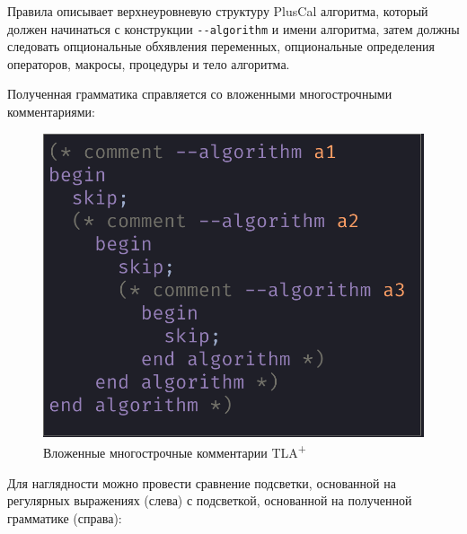 \documentclass[14pt, openany]{report}
\newcommand{\tlapl}{TLA\textsuperscript{+} }
\begin{document}
Правила описывает верхнеуровневую структуру PlusCal алгоритма, который должен начинаться с конструкции \lstinline[style=progStyle]{--algorithm} и имени алгоритма, затем должны следовать опциональные обхявления переменных, опциональные определения операторов, макросы, процедуры и тело алгоритма.

Полученная грамматика справляется со вложенными многострочными комментариями:

\begin{figure}[h]
  \centering
  \includegraphics[scale=0.44]{nestedPcal}
  \caption{Вложенные многострочные комментарии \tlapl}
  \label{fig:nestedPcal}
\end{figure}

Для наглядности можно провести сравнение подсветки, основанной на регулярных выражениях (слева) с подсветкой, основанной на полученной грамматике (справа):
\end{document}
